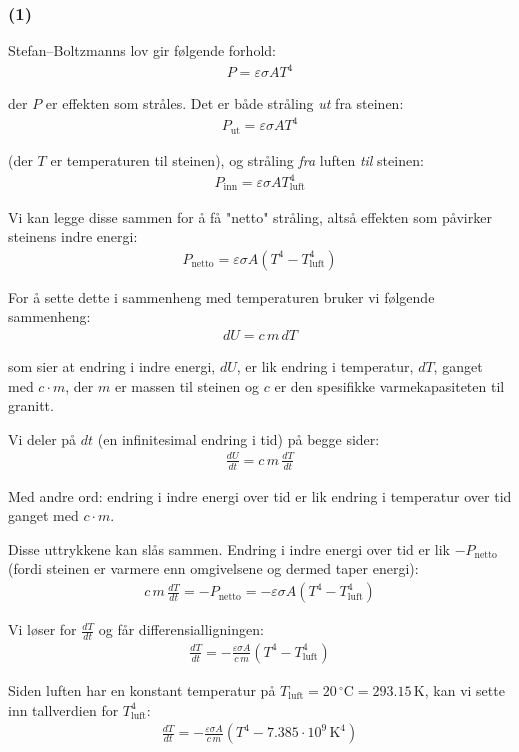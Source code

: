 \subsubsection{(1)}

Stefan--Boltzmanns lov gir følgende forhold:
\begin{align}
P = \varepsilon \sigma A T^4
\end{align}

der $P$ er effekten som str\aa{}les. Det er b\aa{}de str\aa{}ling \emph{ut} fra steinen:
\begin{align}
P_\text{ut} = \varepsilon \sigma A T^4
\end{align}

(der $T$ er temperaturen til steinen), og str\aa{}ling \emph{fra} luften \emph{til} steinen:
\begin{align}
P_\text{inn} = \varepsilon \sigma A T_\text{luft}^4
\end{align}

Vi kan legge disse sammen for \aa{} f\aa{} "netto" str\aa{}ling, alts\aa{} effekten som p\aa{}virker steinens indre energi:
\begin{align}
P_\text{netto} = \varepsilon \sigma A \left(T^4 - T_\text{luft}^4\right)
\end{align}

For \aa{} sette dette i sammenheng med temperaturen bruker vi følgende sammenheng:
\begin{align}
dU = c\, m\, dT
\end{align}

som sier at endring i indre energi, $dU$, er lik endring i temperatur, $dT$, ganget med $c\cdot m$, der $m$ er massen til steinen og $c$ er den spesifikke varmekapasiteten til granitt.

Vi deler p\aa{} $dt$ (en infinitesimal endring i tid) p\aa{} begge sider:
\begin{align}
\frac{dU}{dt} = c\, m\, \frac{dT}{dt}
\end{align}

Med andre ord: endring i indre energi over tid er lik endring i temperatur over tid ganget med $c\cdot m$.

Disse uttrykkene kan sl\aa{}s sammen. Endring i indre energi over tid er lik $-P_\text{netto}$ (fordi steinen er varmere enn omgivelsene og dermed taper energi):
\begin{align}
c\, m\, \frac{dT}{dt} = -P_\text{netto} = -\varepsilon \sigma A \left(T^4 - T_\text{luft}^4\right)
\end{align}

Vi løser for $\frac{dT}{dt}$ og f\aa{}r differensialligningen:
\begin{align}
\boxed{\;\frac{dT}{dt} = -\frac{\varepsilon \sigma A}{c\, m}\left(T^4 - T_\text{luft}^4\right)\;}
\end{align}

Siden luften har en konstant temperatur p\aa{} $T_\text{luft} = 20\,^\circ\text{C} = 293.15\,\text{K}$, kan vi sette inn tallverdien for $T_\text{luft}^4$:
\begin{align}
\frac{dT}{dt} = -\frac{\varepsilon \sigma A}{c\, m}\left(T^4 - 7.385 \cdot 10^{9}\,\text{K}^4\right)
\end{align}